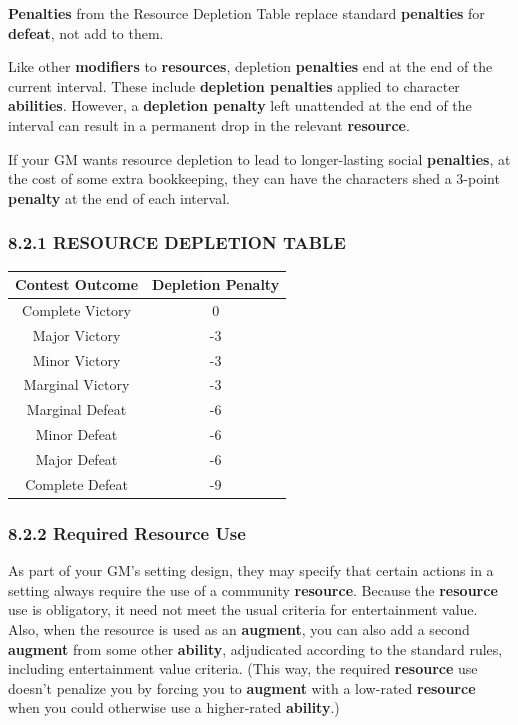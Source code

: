 \documentclass[
]{article}
\begin{document}
\textbf{Penalties} from the Resource Depletion Table replace standard
\textbf{penalties} for \textbf{defeat}, not add to them.

Like other \textbf{modifiers} to \textbf{resources}, depletion
\textbf{penalties} end at the end of the current interval. These include
\textbf{depletion penalties} applied to character \textbf{abilities}.
However, a \textbf{depletion penalty} left unattended at the end of the
interval can result in a permanent drop in the relevant
\textbf{resource}.

If your GM wants resource depletion to lead to longer-lasting social
\textbf{penalties}, at the cost of some extra bookkeeping, they can have
the characters shed a 3-point \textbf{penalty} at the end of each
interval.

\hypertarget{resource-depletion-table}{%
\subsubsection{8.2.1 RESOURCE DEPLETION
TABLE}\label{resource-depletion-table}}

\begin{longtable}[]{@{}cc@{}}
\toprule
Contest Outcome & Depletion Penalty\tabularnewline
\midrule
\endhead
Complete Victory & 0\tabularnewline
Major Victory & -3\tabularnewline
Minor Victory & -3\tabularnewline
Marginal Victory & -3\tabularnewline
Marginal Defeat & -6\tabularnewline
Minor Defeat & -6\tabularnewline
Major Defeat & -6\tabularnewline
Complete Defeat & -9\tabularnewline
\bottomrule
\end{longtable}

\hypertarget{required-resource-use}{%
\subsubsection{8.2.2 Required Resource
Use}\label{required-resource-use}}

As part of your GM's setting design, they may specify that certain
actions in a setting always require the use of a community
\textbf{resource}. Because the \textbf{resource} use is obligatory, it
need not meet the usual criteria for entertainment value. Also, when the
resource is used as an \textbf{augment}, you can also add a second
\textbf{augment} from some other \textbf{ability}, adjudicated according
to the standard rules, including entertainment value criteria. (This
way, the required \textbf{resource} use doesn't penalize you by forcing
you to \textbf{augment} with a low-rated \textbf{resource} when you
could otherwise use a higher-rated \textbf{ability}.)
\end{document}
